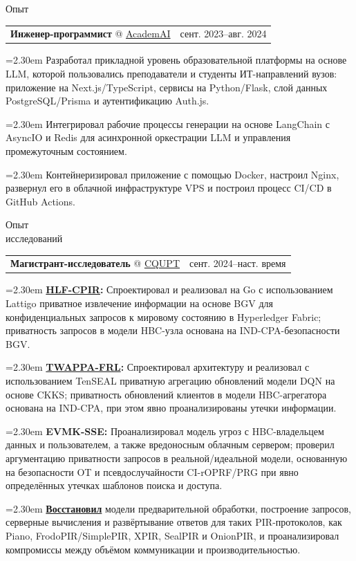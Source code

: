 \documentclass[11pt,a4paper]{article}
\makeatletter
\newcommand{\cvrow}[2]{%
  \noindent
  \begin{minipage}[t]{0.145\textwidth}
    \vspace{0pt}%
    \raggedright
    \fontsize{10.5}{12.5}\selectfont
    #1
  \end{minipage}%
  \hfill
  \begin{minipage}[t]{0.835\textwidth}
    \vspace{0pt}%
    #2
  \end{minipage}\par
}
\newcommand{\workentry}[2]{%
  \noindent
  \begin{tabularx}{\linewidth}
    {@{}X@{\hspace{0.8em}}r@{}}
    #1 & \small #2
  \end{tabularx}\par
  \vspace{0.15em}
}
\newcommand{\workproject}[1]{%
  \noindent
  \hangindent=2.30em
  \hangafter=1
  \hspace*{1.15em}\makebox[1.15em][l]{$\diamond$}#1\par
  \vspace{0.12em}
}
\makeatother
\begin{document}
\vspace{0.50em}

\cvrow{Опыт}{%
  \workentry
    {\textbf{Инженер-программист} @ \href{https://academai.ru/}{AcademAI}}
    {сент. 2023--авг. 2024}
  \workproject{Разработал прикладной уровень образовательной платформы на основе
  LLM, которой пользовались преподаватели и студенты ИТ-направлений вузов:
  приложение на Next.js/TypeScript, сервисы на Python/Flask, слой данных
  PostgreSQL/Prisma и аутентификацию Auth.js.}
  \workproject{Интегрировал рабочие процессы генерации на основе LangChain
  с AsyncIO и Redis для асинхронной оркестрации LLM и управления
  промежуточным состоянием.}
  \workproject{Контейнеризировал приложение с помощью Docker, настроил Nginx,
  развернул его в облачной инфраструктуре VPS и построил процесс CI/CD
  в GitHub Actions.}
}

\vspace{0.50em}

\cvrow{Опыт\\исследований}{%
  \workentry
    {\textbf{Магистрант-исследователь} @
    \href{https://www.cqupt.edu.cn/}{CQUPT}}
    {сент. 2024--наст. время}

  \workproject{\textbf{\href{https://github.com/iasenovets/2_2_HLF_CPIR}{HLF-CPIR}:}
  Спроектировал и реализовал на Go с использованием Lattigo приватное
  извлечение информации на основе BGV для конфиденциальных запросов
  к мировому состоянию в Hyperledger Fabric; приватность запросов
  в модели HBC-узла основана на IND-CPA-безопасности BGV.}

  \workproject{\textbf{\href{https://github.com/hetiantian10/TWAPPA-FRL}{TWAPPA-FRL}:}
  Спроектировал архитектуру и реализовал с использованием TenSEAL приватную
  агрегацию обновлений модели DQN на основе CKKS; приватность обновлений
  клиентов в модели HBC-агрегатора основана на IND-CPA, при этом явно
  проанализированы утечки информации.}

  \workproject{\textbf{EVMK-SSE:} Проанализировал модель угроз с HBC-владельцем
  данных и пользователем, а также вредоносным облачным сервером; проверил
  аргументацию приватности запросов в реальной/идеальной модели, основанную
  на безопасности OT и псевдослучайности CI-rOPRF/PRG при явно определённых
  утечках шаблонов поиска и доступа.}



  \workproject{\textbf{\href{https://iasenovets.github.io/pir-schemes}{Восстановил}}
  модели предварительной обработки, построение запросов, серверные вычисления
  и развёртывание ответов для таких PIR-протоколов, как Piano,
  FrodoPIR/SimplePIR, XPIR, SealPIR и OnionPIR, и проанализировал компромиссы
  между объёмом коммуникации и производительностью.}
}
\end{document}
